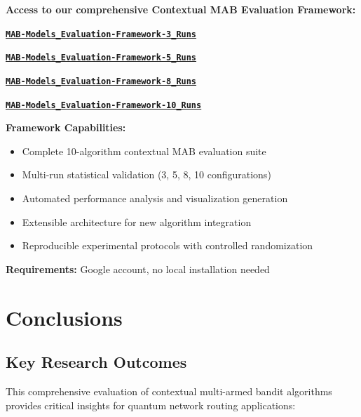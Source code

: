 \documentclass[12pt,a4paper]{article}
\newcommand{\colab}[1]{\textcolor{colabcolor}{\textbf{#1}}}
\begin{document}
\begin{tcolorbox}[colback=colabcolor!20,colframe=colabcolor,title=\textbf{Interactive Framework Access}]

\begin{center}
\textbf{Access to our comprehensive Contextual MAB Evaluation Framework:}
\vspace{0.3cm}

\href{https://colab.research.google.com/drive/PLACEHOLDER_3_RUNS}{\colab{\texttt{MAB-Models\_Evaluation-Framework-3\_Runs}}}

\href{https://colab.research.google.com/drive/PLACEHOLDER_5_RUNS}{\colab{\texttt{MAB-Models\_Evaluation-Framework-5\_Runs}}}

\href{https://colab.research.google.com/drive/PLACEHOLDER_8_RUNS}{\colab{\texttt{MAB-Models\_Evaluation-Framework-8\_Runs}}}

\href{https://colab.research.google.com/drive/PLACEHOLDER_10_RUNS}{\colab{\texttt{MAB-Models\_Evaluation-Framework-10\_Runs}}}

\vspace{0.3cm}
\textbf{Framework Capabilities:}
\begin{itemize}
\item Complete 10-algorithm contextual MAB evaluation suite
\item Multi-run statistical validation (3, 5, 8, 10 configurations)
\item Automated performance analysis and visualization generation
\item Extensible architecture for new algorithm integration
\item Reproducible experimental protocols with controlled randomization
\end{itemize}

\textbf{Requirements:} Google account, no local installation needed
\end{center}
\end{tcolorbox}

\section{Conclusions}

\subsection{Key Research Outcomes}

This comprehensive evaluation of contextual multi-armed bandit algorithms provides critical insights for quantum network routing applications:
\end{document}
